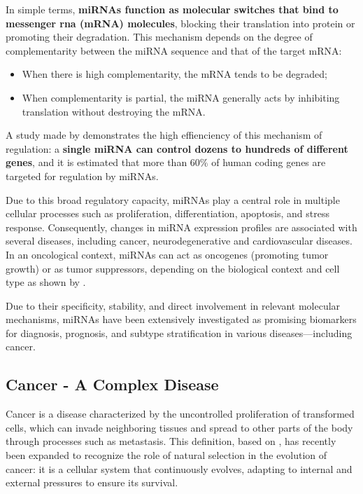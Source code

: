 In simple terms, \textbf{miRNAs function as molecular switches that bind to
  messenger \gls{rna} (mRNA) molecules}, blocking their translation into protein
or promoting their degradation. This mechanism depends on the degree of
complementarity between the miRNA sequence and that of the target mRNA:

\begin{itemize}
  \item When there is high complementarity, the mRNA tends to be degraded;
  \item When complementarity is partial, the miRNA generally acts by inhibiting
        translation without destroying the mRNA.
\end{itemize}

A study made by \textcite{role_mirna_Calaf2023} demonstrates the high
effienciency of this mechanism of regulation: a \textbf{single miRNA can
  control dozens to hundreds of different genes}, and it is estimated that more
than $60\%$ of human coding genes are targeted for regulation by miRNAs.

Due to this broad regulatory capacity, miRNAs play a central role in multiple
cellular processes such as proliferation, differentiation, apoptosis, and
stress response. Consequently, changes in miRNA expression profiles are
associated with several diseases, including cancer, neurodegenerative and
cardiovascular diseases. In an oncological context, miRNAs can act as oncogenes
(promoting tumor growth) or as tumor suppressors, depending on the biological
context and cell type as shown by
\textcite{regulatory_mecha_mirnaGulyaeva2016}.

Due to their specificity, stability, and direct involvement in relevant
molecular mechanisms, miRNAs have been extensively investigated as promising
biomarkers for diagnosis, prognosis, and subtype stratification in various
diseases—including cancer.

\subsection{Cancer - A Complex Disease}
Cancer is a disease characterized by the uncontrolled proliferation of
transformed cells, which can invade neighboring tissues and spread to other
parts of the body through processes such as metastasis. This definition, based
on \textcite{NCI2021,def_of_cancer_Brown2023}, has recently been expanded to
recognize the role of natural selection in the evolution of cancer: it is a
cellular system that continuously evolves, adapting to internal and external
pressures to ensure its survival.


